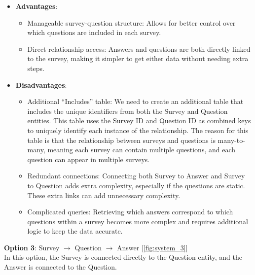\begin{itemize}
    \item \textbf{Advantages}:
    \begin{itemize}
        \item Manageable survey-question structure: Allows for better control over which questions are included in each survey.
        \item Direct relationship access: Answers and questions are both directly linked to the survey, making it simpler to get either data without needing extra steps.
    \end{itemize}
    \item \textbf{Disadvantages}:
    \begin{itemize}
        \item Additional ``Includes'' table: We need to create an additional table that includes the unique identifiers from both the Survey and Question entities. This table uses the Survey ID and Question ID as combined keys to uniquely identify each instance of the relationship.  The reason for this table is that the relationship between surveys and questions is many-to-many, meaning each survey can contain multiple questions, and each question can appear in multiple surveys.
        \item Redundant connections: Connecting both Survey to Answer and Survey to Question adds extra complexity, especially if the questions are static. These extra links can add unnecessary complexity.
        \item Complicated queries: Retrieving which answers correspond to which questions within a survey becomes more complex and requires additional logic to keep the data accurate.
    \end{itemize}
\end{itemize}

\vspace{5mm}

\noindent \textbf{Option 3}: Survey $\rightarrow$ Question $\rightarrow$ Answer [\ref{fig:system_3}] \\
In this option, the Survey is connected directly to the Question entity, and the Answer is connected to the Question.

